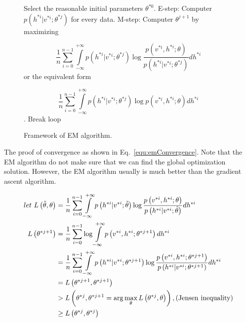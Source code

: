 \documentclass[runningheads,openany]{xhlPaper}
\begin{document}
\begin{figure}
\caption{Framework of EM algorithm.}
\label{fig:emAlgorithm}
\begin{algorithmic}
\STATE Select the reasonable initial parameters $\theta ^{*0}$.
\LOOP 
\STATE E-step: Computer $p\left( {{h^{*i}}|{v^{*i}};\theta ^{*j} } \right)$ for every data.
\STATE M-step: Computer $\theta ^{j + 1}$ by maximizing 

\begin{displaymath}
\frac{1}{n}\sum\limits_{i = 0}^{n - 1} {\int\limits_{ - \infty }^{ + \infty } {p\left( {{h^{*i}}|{v^{*i}};\theta ^{*j} } \right)\log \frac{{p\left( {{v^{*i}},{h^{*i}};\theta } \right)}}{{p\left( {{h^{*i}}|{v^{*i}};\theta ^{*j} } \right)}}d{h^{*i}}} }
\end{displaymath}
or the equivalent form 

\begin{displaymath}
\frac{1}{n}\sum\limits_{i = 0}^{n - 1} {\int\limits_{ - \infty }^{ + \infty } {p\left( {{h^{*i}}|{v^{*i}};\theta ^{*j} } \right)\log {p\left( {{v^{*i}},{h^{*i}};\theta } \right)}}d{h^{*i}}}
\end{displaymath}.
\STATE Break loop
\ENDIF
\ENDLOOP
\end{algorithmic}
\end{figure}

The proof of convergence as shown in Eq.~\ref{equ:emConvergence}. Note that the EM algorithm do not make sure that we can find the global optimization solution. However, the EM algorithm usually is much better than the gradient ascent algorithm.

\begin{equation}
\label{equ:emConvergence}
\begin{aligned}
let\ L\left( {\tilde \theta ,\theta } \right) &= \frac{1}{n}\sum\limits_{i = 0}^{n - 1} {\int\limits_{ - \infty }^{ + \infty } {p\left( {{h^{*i}}|{v^{*i}};\tilde \theta } \right)\log \frac{{p\left( {{v^{*i}},{h^{*i}};\theta } \right)}}{{p\left( {{h^{*i}}|{v^{*i}};\tilde \theta } \right)}}d{h^{*i}}} } \\
L\left( {{\theta ^{*j + 1}}} \right) &= \frac{1}{n}\sum\limits_{i = 0}^{n - 1} {\log \int\limits_{ - \infty }^{ + \infty } {p\left( {{v^{*i}},{h^{*i}};{\theta ^{*j + 1}}} \right)d{h^{*i}}} } \\
 &= \frac{1}{n}\sum\limits_{i = 0}^{n - 1} {\int\limits_{ - \infty }^{ + \infty } {p\left( {{h^{*i}}|{v^{*i}};{\theta ^{*j + 1}}} \right)\log \frac{{p\left( {{v^{*i}},{h^{*i}};{\theta ^{*j + 1}}} \right)}}{{p\left( {{h^{*i}}|{v^{*i}};{\theta ^{*j + 1}}} \right)}}d{h^{*i}}} } \\
 &= L\left( {{\theta ^{*j + 1}},{\theta ^{*j + 1}}} \right)\\
 &> L\left( {{\theta ^{*j}},{\theta ^{*j + 1}} = \arg \mathop {\max }\limits_\theta  L\left( {{\theta ^{*j}},\theta } \right)} \right), \left( {{\rm{Jensen\ inequality}}} \right)\\
 &\ge L\left( {{\theta ^{*j}},{\theta ^{*j}}} \right)
\end{aligned}
\end{equation}
\end{document}
